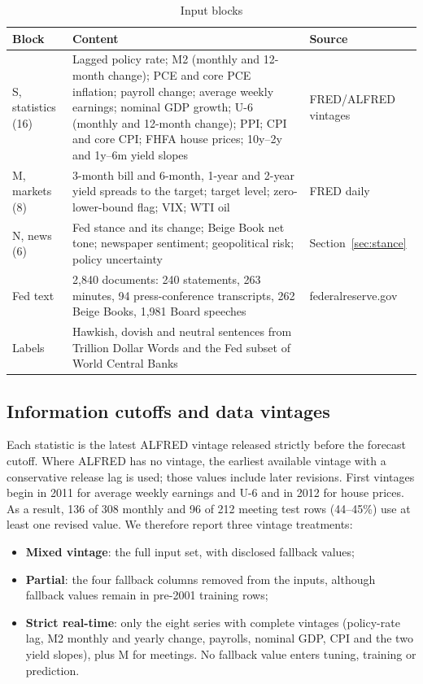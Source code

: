 \documentclass[11pt]{article}
\begin{document}
\begin{table}[ht]\centering\small
\caption{Input blocks}\label{tab:blocks}
\begin{tabular}{p{2.8cm}p{8.6cm}p{3.2cm}}
\toprule
Block & Content & Source \\ \midrule
S, statistics (16) & Lagged policy rate; M2 (monthly and 12-month change); PCE and core PCE inflation;
payroll change; average weekly earnings; nominal GDP growth; U-6 (monthly and 12-month change); PPI; CPI and core
CPI; FHFA house prices; 10y--2y and 1y--6m yield slopes & FRED/ALFRED vintages \\
M, markets (8) & 3-month bill and 6-month, 1-year and 2-year yield spreads to the target; target level;
zero-lower-bound flag; VIX; WTI oil & FRED daily \\
N, news (6) & Fed stance and its change; Beige Book net tone; newspaper sentiment; geopolitical risk; policy
uncertainty & Section~\ref{sec:stance} \\
Fed text & 2,840 documents: 240 statements, 263 minutes, 94 press-conference transcripts, 262 Beige Books, 1,981
Board speeches & federalreserve.gov \\
Labels & Hawkish, dovish and neutral sentences from Trillion Dollar Words and the Fed subset of World Central Banks
& \citet{shah2023,shah2025} \\
\bottomrule
\end{tabular}
\end{table}

\subsection{Information cutoffs and data vintages}\label{sec:vintage}

Each statistic is the latest ALFRED vintage released strictly before the forecast cutoff. Where ALFRED has no
vintage, the earliest available vintage with a conservative release lag is used; those values include later
revisions. First vintages begin in 2011 for average weekly earnings and U-6 and in 2012 for house prices. As a
result, 136 of 308 monthly and 96 of 212 meeting test rows (44--45\%) use at least one revised value. We therefore
report three vintage treatments:
\begin{itemize}
  \item \textbf{Mixed vintage}: the full input set, with disclosed fallback values;
  \item \textbf{Partial}: the four fallback columns removed from the inputs, although fallback values remain in
        pre-2001 training rows;
  \item \textbf{Strict real-time}: only the eight series with complete vintages (policy-rate lag, M2 monthly and
        yearly change, payrolls, nominal GDP, CPI and the two yield slopes), plus M for meetings. No fallback value
        enters tuning, training or prediction.
\end{itemize}
\end{document}
